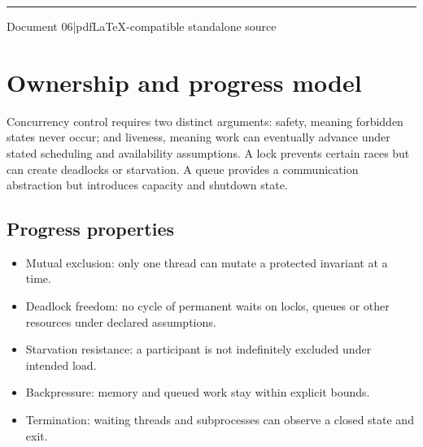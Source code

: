 \documentclass[11pt,letterpaper,oneside]{report}
\begin{document}
\hypersetup{pageanchor=false}%
\begin{titlepage}\centering{}\vspace{0.6cm}{\Large Pthreads, processes, synchronization and message transport\par}\vspace{2cm}\rule{0.75\textwidth}{1.2pt}\par\vspace{0.55cm}{\large An original companion to Michael Kerrisk\textquotesingle s 2010 text}\par\vspace{0.3cm}{\large Edition 1.0\quad |\quad October 2026}\par\vfill{\small Document 06\quad |\quad pdfLaTeX-compatible standalone source}\par\end{titlepage}\hypersetup{pageanchor=true}
\tableofcontents\clearpage
\chapter{Ownership and progress model}
Concurrency control requires two distinct arguments: safety, meaning forbidden states never occur; and liveness, meaning work can eventually advance under stated scheduling and availability assumptions. A lock prevents certain races but can create deadlocks or starvation. A queue provides a communication abstraction but introduces capacity and shutdown state.

\section{Progress properties}
\begin{itemize}
\item Mutual exclusion: only one thread can mutate a protected invariant at a time.
\item Deadlock freedom: no cycle of permanent waits on locks, queues or other resources under declared assumptions.
\item Starvation resistance: a participant is not indefinitely excluded under intended load.
\item Backpressure: memory and queued work stay within explicit bounds.
\item Termination: waiting threads and subprocesses can observe a closed state and exit.
\end{itemize}
\end{document}
